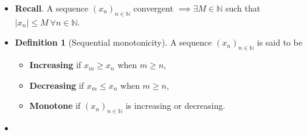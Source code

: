 \documentclass{article}
\newcommand{\R}{\mathbb{R}}
\newcommand{\N}{\mathbb{N}}
\newcommand{\seq}[2]{(#1_{#2})_{#2 \in \N}}
\newcommand{\?}{\stackrel{?}{=}}
\newcommand{\smallblacksquare}{\rule{0.5em}{0.5em}}
\theoremstyle{definition} %
\newtheorem{definition}[theorem]{Definition} %
\begin{document}
\begin{itemize}
\begin{lemma}
              Every convergent sequence is bounded.
          \end{lemma}
          \begin{proof}
              Let $\seq{x}{n}$ be a convergent sequence, that is, there exists some $x \in \R$ such that for all $\varepsilon > 0$, there exists some $N(\varepsilon) \in \N$ and
              $$|x - x_n| \leq \varepsilon \ \forall n \geq N(\varepsilon).$$
              In particular, take for $\varepsilon = 1$, there is $N(1)$ such that
              $$|x_n - x| \leq 1 \ \forall n \geq N(1).$$
              Recall the reverse triangle inequality,
              \begin{alignat*}{2}
                  |x_n| - |x|       & \leq |x - x_n|     &  & \leq 1 \quad n \geq N(1) \\
                  \implies \, |x_n| & \leq 1 + |x| \quad &  & n \geq N(1)
              \end{alignat*}
              Let $M = \max\{|x_0|, |x_1|, \ldots, |x_{N(1) - 1}|, 1 + |x|\}$. Then certainly
              \begin{align*}
                  |x_n|          & \leq M \qquad n \leq N(1)       \\
                  |x_n|          & \leq M \qquad n \geq N(1)       \\
                  \implies |x_n| & \leq M \qquad \forall n \in \N.
              \end{align*}
          \end{proof}
    \item \textbf{Recall}. A sequence $(x_n)_{n \in \N}$ convergent $\implies \exists M \in \N$ such that $|x_n| \leq M \ \forall n \in \N$.
    \item[]
          \begin{definition}[Sequential monotonicity]
              A sequence $\seq{x}{n}$ is said to be
              \begin{itemize}[label=\smallblacksquare]
                  \item \textbf{Increasing} if $x_m \geq x_n$ when $m \geq n$,
                  \item \textbf{Decreasing} if $x_m \leq x_n$ when $m \geq n$,
                  \item \textbf{Monotone} if $\seq{x}{n}$ is increasing or decreasing.
              \end{itemize}
          \end{definition}
    \item[]
          \begin{lemma}

\end{lemma}
\end{itemize}
\end{document}
